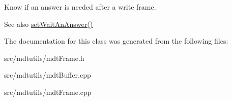Know if an answer is needed after a write frame. 

\begin{DoxySeeAlso}{See also}
\hyperlink{classmdt_frame_a3b9a331858df9061879592fab1b346f5}{setWaitAnAnswer()} 
\end{DoxySeeAlso}


The documentation for this class was generated from the following files:\begin{DoxyCompactItemize}
\item 
src/mdtutils/mdtFrame.h\item 
src/mdtutils/mdtBuffer.cpp\item 
src/mdtutils/mdtFrame.cpp\end{DoxyCompactItemize}
